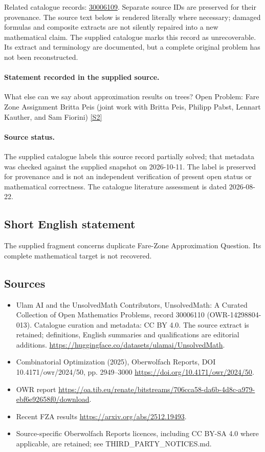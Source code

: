 \documentclass[11pt]{article}
\begin{document}
Related catalogue records: \href{https://mehmetmars7.github.io/Erdosproblems-llm-hunter/problem.html?type=open_problems&id=30006109}{30006109}. Separate source IDs are preserved for their provenance.
The source text below is rendered literally where necessary; damaged formulas and composite extracts are not silently repaired into a new mathematical claim.
The supplied catalogue marks this record as unrecoverable. Its extract and terminology are documented, but a complete original problem has not been reconstructed.
\paragraph{Statement recorded in the supplied source.}
What else can we say about approximation results on trees? Open Problem: Fare Zone Assignment Britta Peis (joint work with Britta Peis, Philipp Pabst, Lennart Kauther, and Sam Fiorini) \href{https://doi.org/10.4171/owr/2024/50}{[S2]}
\paragraph{Source status.}
The supplied catalogue labels this source record partially solved; that metadata was checked against the supplied snapshot on 2026-10-11. The label is preserved for provenance and is not an independent verification of present open status or mathematical correctness. The catalogue literature assessment is dated 2026-08-22.
\subsection{Short English statement}
The supplied fragment concerns duplicate Fare-Zone Approximation Question. Its complete mathematical target is not recovered.
\subsection{Sources}
\begin{itemize}
\item[S1] Ulam AI and the UnsolvedMath Contributors, UnsolvedMath: A Curated Collection of Open Mathematics Problems, record 30006110 (OWR-14298804-013). Catalogue curation and metadata: CC BY 4.0. The source extract is retained; definitions, English summaries and qualifications are editorial additions.
\url{https://huggingface.co/datasets/ulamai/UnsolvedMath}.
\item[S2] Combinatorial Optimization (2025), Oberwolfach Reports, DOI 10.4171/owr/2024/50, pp. 2949--3000
\url{https://doi.org/10.4171/owr/2024/50}.
\item[S3] OWR report
\url{https://oa.tib.eu/renate/bitstreams/706cca58-da6b-4d8c-a979-ebf6e92658f0/download}.
\item[S4] Recent FZA results
\url{https://arxiv.org/abs/2512.19493}.
\item Source-specific Oberwolfach Reports licences, including CC BY-SA 4.0 where applicable, are retained; see THIRD\_PARTY\_NOTICES.md.
\end{itemize}
\end{document}
